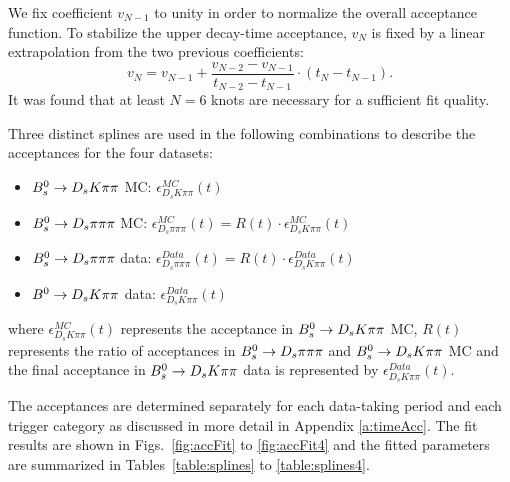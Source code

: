 We fix coefficient $v_{N-1}$ to unity in order to normalize the overall acceptance function. 
To stabilize the upper decay-time acceptance, $v_{N}$ is fixed by a linear extrapolation from the two previous coefficients:
\begin{equation}   
v_{N} = v_{N-1} + \frac{v_{N-2} - v_{N-1}}{t_{N-2} - t_{N-1}} \cdot (t_{N} - t_{N-1}).
\label{eq:SplineExtra}
\end{equation}
It was found that at least $N=6$ knots are necessary for a sufficient fit quality.

\clearpage
Three distinct splines are used in the following combinations to describe the acceptances for the
four datasets:
\begin{itemize}
	\item ${{B}^0_{s}} \rightarrow D_sK\pi\pi$ MC:   $\epsilon^{MC}_{D_sK\pi\pi}(t)$ 
	\item ${{B}^0_{s}} \rightarrow D_s\pi\pi\pi$ MC:   $\epsilon^{MC}_{D_s\pi\pi\pi}(t) = R(t) \cdot \epsilon^{MC}_{D_sK\pi\pi}(t)$ 
	\item ${{B}^0_{s}} \rightarrow D_s\pi\pi\pi$ data:   $\epsilon^{Data}_{D_s\pi\pi\pi}(t) = R(t) \cdot \epsilon^{Data}_{D_sK\pi\pi}(t)$ 
	\item ${{B}^0} \rightarrow D_sK\pi\pi$ data:   $\epsilon^{Data}_{D_sK\pi\pi}(t)$    
\end{itemize}
where $\epsilon^{MC}_{D_sK\pi\pi}(t)$ represents the acceptance in ${{B}^0_{s}} \rightarrow D_sK\pi\pi$ MC, 
$R(t)$ represents  the ratio of acceptances in ${{B}^0_{s}} \rightarrow D_s\pi\pi\pi$ and ${{B}^0_{s}} \rightarrow D_sK\pi\pi$ MC
and the final acceptance in ${{B}^0_{s}} \rightarrow D_sK\pi\pi$ data
is represented by $\epsilon^{Data}_{D_sK\pi\pi}(t)$.

The acceptances are determined separately for each data-taking period
and each trigger category as discussed in more detail in Appendix \ref{a:timeAcc}.
The fit results are shown in Figs.~\ref{fig:accFit} to \ref{fig:accFit4} and the 
fitted parameters are summarized in Tables~\ref{table:splines} to \ref{table:splines4}.
 
